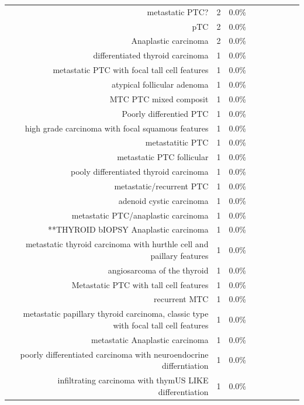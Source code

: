 \begin{table}[htbp]
\begin{tabular}{lrrrrrrrrr}
 & metastatic PTC? & 2 & 0.0\% &  &  &  &  &  &  \\
 & pTC & 2 & 0.0\% &  &  &  &  &  &  \\
 & Anaplastic carcinoma & 2 & 0.0\% &  &  &  &  &  &  \\
 & differentiated thyroid carcinoma & 1 & 0.0\% &  &  &  &  &  &  \\
 & metastatic PTC with focal tall cell features & 1 & 0.0\% &  &  &  &  &  &  \\
 & atypical follicular adenoma & 1 & 0.0\% &  &  &  &  &  &  \\
 & MTC
PTC mixed composit & 1 & 0.0\% &  &  &  &  &  &  \\
 & Poorly differentied PTC & 1 & 0.0\% &  &  &  &  &  &  \\
 & high grade carcinoma with focal squamous features & 1 & 0.0\% &  &  &  &  &  &  \\
 & metastatitic PTC & 1 & 0.0\% &  &  &  &  &  &  \\
 & metastatic PTC follicular & 1 & 0.0\% &  &  &  &  &  &  \\
 & pooly differentiated thyroid carcinoma & 1 & 0.0\% &  &  &  &  &  &  \\
 & metastatic/recurrent PTC & 1 & 0.0\% &  &  &  &  &  &  \\
 & adenoid cystic carcinoma & 1 & 0.0\% &  &  &  &  &  &  \\
 & metastatic PTC/anaplastic carcinoma & 1 & 0.0\% &  &  &  &  &  &  \\
 & **THYROID bIOPSY
Anaplastic carcinoma & 1 & 0.0\% &  &  &  &  &  &  \\
 & metastatic thyroid carcinoma with hurthle cell and paillary features & 1 & 0.0\% &  &  &  &  &  &  \\
 & angiosarcoma of the thyroid & 1 & 0.0\% &  &  &  &  &  &  \\
 & Metastatic PTC with tall cell features & 1 & 0.0\% &  &  &  &  &  &  \\
 & recurrent MTC & 1 & 0.0\% &  &  &  &  &  &  \\
 &   metastatic papillary thyroid carcinoma, classic type with focal tall cell features & 1 & 0.0\% &  &  &  &  &  &  \\
 & metastatic Anaplastic carcinoma & 1 & 0.0\% &  &  &  &  &  &  \\
 & poorly differentiated carcinoma with neuroendocrine differntiation & 1 & 0.0\% &  &  &  &  &  &  \\
 &   infiltrating carcinoma with thymUS LIKE differentiation & 1 & 0.0\% &  &  &  &  &  &  \\

\end{tabular}
\end{table}
